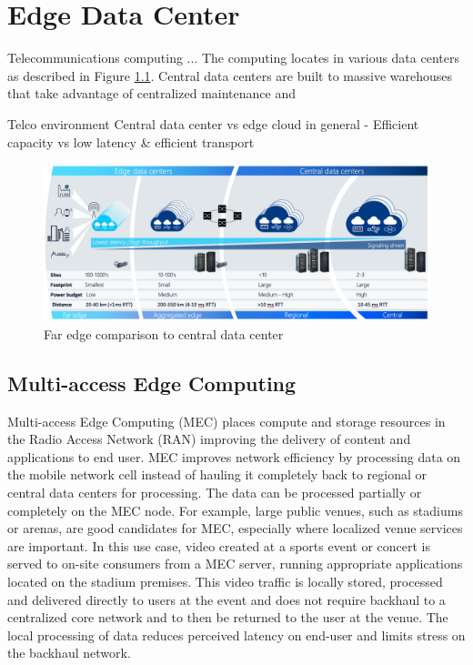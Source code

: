 \chapter{Edge Data Center}
\label{chapter:edge}

Telecommunications computing ... The computing locates in various data centers as described in Figure \ref{fig:AirFrame}. Central data centers are built to massive warehouses that take advantage of centralized maintenance and 

Telco environment
Central data center vs edge cloud in general
    - Efficient capacity vs low latency \& efficient transport


\begin{figure}[ht]
  \begin{center}
    \includegraphics[width=13.5cm]{images/AirFrame.png}
    \caption{Far edge comparison to central data center \cite{AirFrameOpenEdgeServer}}
    \label{fig:AirFrame}
  \end{center}
\end{figure}

\section{Multi-access Edge Computing}

Multi-access Edge Computing (MEC) places compute and storage resources in the Radio Access Network (RAN) improving the delivery of content and applications to end user. MEC improves network efficiency by processing data on the mobile network cell instead of hauling it completely back to regional or central data centers for processing. The data can be processed partially or completely on the MEC node. For example, large public venues, such as stadiums or arenas, are good candidates for MEC, especially where localized venue services are important. In this use case, video created at a sports event or concert is served to on-site consumers from a MEC server, running appropriate applications located on the stadium premises. This video traffic is locally stored, processed and delivered directly to users at the event and does not require backhaul to a centralized core network and to then be returned to the user at the venue. The local processing of data reduces perceived latency on end-user and limits stress on the backhaul network. \cite{Brown2016}

